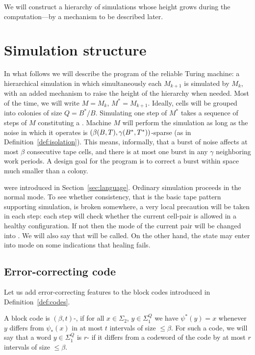 \documentclass[11pt]{memoir}
\theoremstyle{definition} %
\renewcommand{\le}{\leq}
\def\B{B}
\newcommand{\Q}{Q} %
\newcommand{\Tu}{T}
\newcommand{\Tus}{T^{*}}
\begin{document}
We will construct a hierarchy of simulations whose height grows during the
computation---by a mechanism to be described later.


\section{Simulation structure}\label{sec:sim-struc}

In what follows we will describe the program of the reliable Turing machine:
a hierarchical simulation in which simultaneously each \( M_{k+1} \) is simulated
by \( M_{k} \), with an added mechanism to
raise the height of the hierarchy when needed.
Most of the time, we will write \( M=M_{k} \),  \( M^{*}=M_{k+1} \).
Ideally, cells will be grouped into colonies of size \( \Q=\B^{*}/\B \).
Simulating one step of \( M^{*} \) takes a sequence of steps of \( M \)
constituting a .
Machine \( M \) will perform the simulation as long as the noise
in which it operates is \( (\beta\pair{\B}{\Tu}, \gamma\pair{\B^{*}}{\Tus}) \)-sparse
(as in Definition~\ref{def:isolation}).
This means, informally, that a burst of noise affects at most \( \beta \) consecutive tape cells,  
and there is at most one burst in any \( \gamma \)  neighboring work periods.
A design goal for the program is to
correct a burst within space much smaller than a colony.

 were introduced in Section~\ref{sec:language}.
Ordinary simulation proceeds in the normal mode. 
To see whether consistency, that is the basic tape pattern
supporting simulation, is broken somewhere, a very local precaution will be taken in each step:
each step will check whether the current cell-pair is allowed in a healthy configuration.
If not then the mode of the current pair will be changed into .
We will also say that  will be called.
On the other hand, the state may enter into  mode on some indications that
healing fails.


\subsection{Error-correcting code}\label{sec:coding}

Let us add error-correcting features to the block codes introduced in
Definition~\ref{def:codes}.

\begin{sloppypar}
\begin{definition}\label{def:err-code}
A block code is \( (\beta,t) \)-,
if for all \( x\in\Sigma_{2} \), \( y\in\Sigma_{1}^{\Q} \) we
have \( \psi^{*}(y)=x \) whenever \( y \) differs from
\( \psi_{*}(x) \) in at most \( t \) intervals of size \( \le\beta \).
For such a code, we will say that a word \( y\in\Sigma_{1}^{\Q} \) is \( r \)-
if it differs from a codeword of the code by at most \( r \) intervals of size \( \le\beta \).
\end{definition}
  \end{sloppypar}
\end{document}

